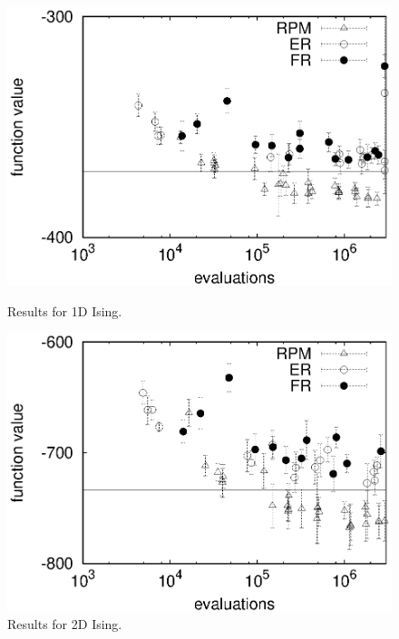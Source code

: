 \begin{figure}[tb]
\centerline{\includegraphics[width=\figlength\linewidth]{data_rpm/idea_vs_rwor_1d.eps}}
\caption{Results for 1D Ising.}
\label{result_1d}

\vspace{0.5cm}

\centerline{\includegraphics[width=\figlength\linewidth]{data_rpm/idea_vs_rwor_2d.eps}}
\caption{Results for 2D Ising.}
\label{result_2d}
\end{figure}


